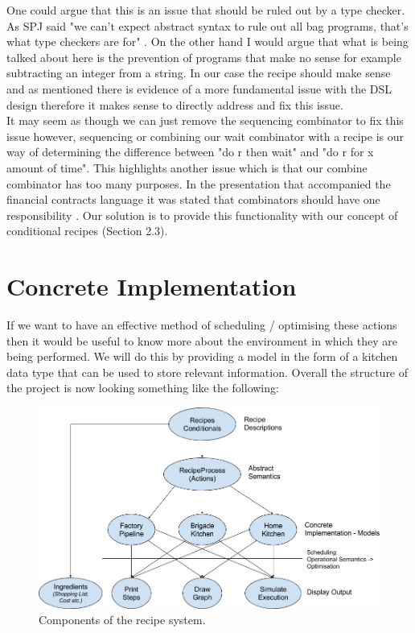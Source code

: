 \documentclass[11pt]{article}
\begin{document}
    One could argue that this is an issue that should be ruled out by a type checker. As SPJ
    said "we can’t expect abstract syntax to rule out all bag programs, that’s what type
    checkers are for" \cite{core}. On the other hand I would argue that what is being talked
    about here is the prevention of programs that make no sense for example subtracting an integer
    from a string. In our case the recipe should make sense and as mentioned there is evidence
    of a more fundamental issue with the DSL design therefore it makes sense to directly address
    and fix this issue. \\
    
    It may seem as though we can just remove the sequencing combinator to fix this issue however,
    sequencing or combining our wait combinator with a recipe is our way of determining the
    difference between "do r then wait" and "do r for x amount of time". This highlights another
    issue which is that our combine combinator has too many purposes. In the presentation that
    accompanied the financial contracts language it was stated that combinators should have
    one responsibility \cite{contracts-pp}. Our solution is to provide this functionality 
    with our concept of conditional recipes (Section 2.3). \\

    \section{Concrete Implementation}

    If we want to have an effective method of scheduling / optimising these actions then it would
    be useful to know more about the environment in which they are being performed. We will do this
    by providing a model in the form of a kitchen data type that can be used to store relevant
    information. Overall the structure of the project is now looking something like the following:
    
    \begin{figure}[ht]
        \centering
            \includegraphics[width=\textwidth,keepaspectratio]{recipe_flow.png}
        \caption{Components of the recipe system.}
    \end{figure}
\end{document}
